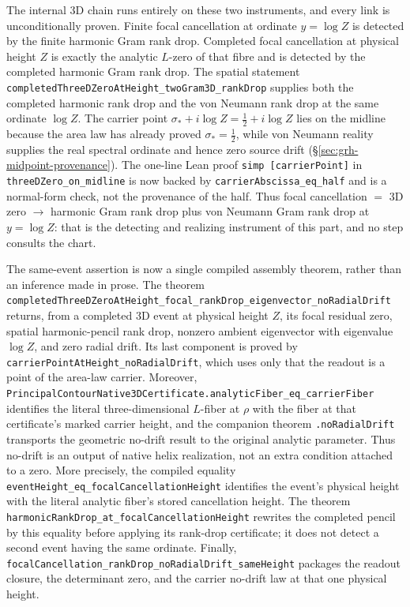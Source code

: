 The internal 3D chain runs entirely on these two instruments, and every link
is unconditionally proven.  Finite focal cancellation at ordinate
\(y=\log Z\) is detected by the finite harmonic Gram rank drop.  Completed
focal cancellation at physical height \(Z\) is exactly the analytic
\(L\)-zero of that fibre and is detected by the completed harmonic Gram rank
drop.  The spatial statement
\texttt{completedThreeDZeroAtHeight\_twoGram3D\_rankDrop} supplies both the
completed harmonic rank drop and the von Neumann rank drop at the same
ordinate \(\log Z\).  The carrier point
\(\sigma_*+i\log Z=\tfrac12+i\log Z\) lies on the midline because the area law has
already proved \(\sigma_*=\tfrac12\), while von Neumann reality supplies the
real spectral ordinate and hence zero source drift
(\S\ref{sec:grh-midpoint-provenance}).  The one-line Lean proof
\texttt{simp [carrierPoint]} in \texttt{threeDZero\_on\_midline} is now
backed by \texttt{carrierAbscissa\_eq\_half} and is a
normal-form check, not the provenance of the half. Thus focal
cancellation \(=\) 3D zero \(\to\) harmonic Gram rank drop plus von Neumann
Gram rank drop at \(y=\log Z\): that is the detecting and realizing
instrument of this part, and no step consults the chart.

The same-event assertion is now a single compiled assembly theorem, rather
than an inference made in prose.  The theorem
\texttt{completedThreeDZeroAtHeight\_focal\_rankDrop\_eigenvector\_noRadialDrift}
returns, from a completed 3D event at physical height \(Z\), its focal residual
zero, spatial harmonic-pencil rank drop, nonzero ambient eigenvector with
eigenvalue \(\log Z\), and zero radial drift.  Its last component is proved by
\texttt{carrierPointAtHeight\_noRadialDrift}, which uses only that the readout
is a point of the area-law carrier.  Moreover,
\texttt{PrincipalContourNative3DCertificate.analyticFiber\_eq\_carrierFiber}
identifies the literal three-dimensional \(L\)-fiber at \(\rho\) with the
fiber at that certificate's marked carrier height, and the companion theorem
\texttt{.noRadialDrift} transports the geometric no-drift result to the
original analytic parameter.  Thus no-drift is an output of native helix
realization, not an extra condition attached to a zero.
More precisely, the compiled equality
\texttt{eventHeight\_eq\_focalCancellationHeight} identifies the event's
physical height with the literal analytic fiber's stored cancellation height.
The theorem \texttt{harmonicRankDrop\_at\_focalCancellationHeight} rewrites the
completed pencil by this equality before applying its rank-drop certificate;
it does not detect a second event having the same ordinate.  Finally,
\texttt{focalCancellation\_rankDrop\_noRadialDrift\_sameHeight} packages the
readout closure, the determinant zero, and the carrier no-drift law at that one
physical height.

